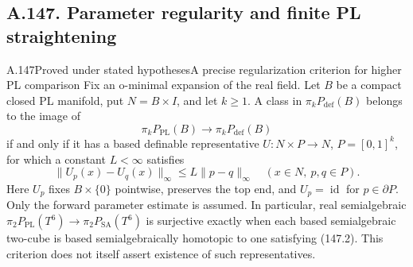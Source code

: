 \subsection{A.147. Parameter regularity and finite PL straightening}

\begin{saresult}{A.147}{Proved under stated hypotheses}{A precise regularization criterion for higher PL comparison}
Fix an o-minimal expansion of the real field. Let \(B\) be a compact
closed PL manifold, put \(N=B\times I\), and let \(k\geq1\).
A class in \(\pi_kP_{\mathrm{def}}(B)\) belongs to the image of
\[
 \pi_kP_{\mathrm{PL}}(B)\longrightarrow\pi_kP_{\mathrm{def}}(B)
 \tag{147.1}
\]
if and only if it has a based definable representative
\(U:N\times P\to N\), \(P=[0,1]^k\), for which a constant \(L<\infty\)
satisfies
\[
 \|U_p(x)-U_q(x)\|_\infty\leq L\|p-q\|_\infty
 \quad(x\in N,\ p,q\in P).
 \tag{147.2}
\]
Here \(U_p\) fixes \(B\times\{0\}\) pointwise, preserves the top end,
and \(U_p=\operatorname{id}\) for \(p\in\partial P\).
Only the forward parameter estimate is assumed.
In particular, real semialgebraic
\(\pi_2P_{\mathrm{PL}}(T^6)\to\pi_2P_{\mathrm{SA}}(T^6)\)
is surjective exactly when each based semialgebraic two-cube is based
semialgebraically homotopic to one satisfying (147.2).
This criterion does not itself assert existence of such representatives.
\end{saresult}

